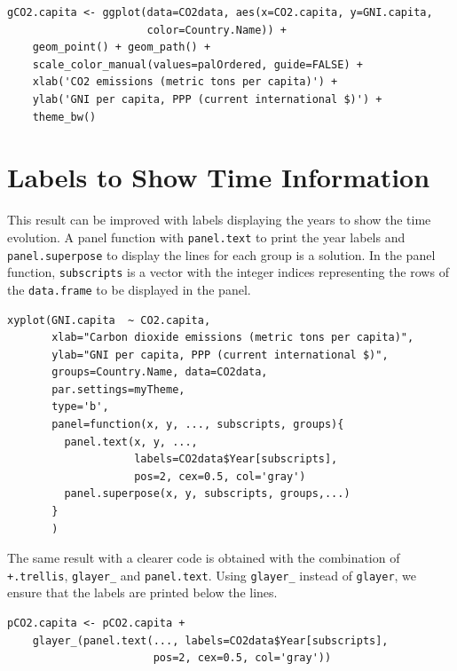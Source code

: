 \documentclass[smallroyalvopaper]{memoir}
\begin{document}
\lstset{language=R,numbers=none}
\begin{lstlisting}
gCO2.capita <- ggplot(data=CO2data, aes(x=CO2.capita, y=GNI.capita,
                      color=Country.Name)) +
    geom_point() + geom_path() +
    scale_color_manual(values=palOrdered, guide=FALSE) +
    xlab('CO2 emissions (metric tons per capita)') +
    ylab('GNI per capita, PPP (current international $)') +
    theme_bw()
\end{lstlisting}
\section{Labels to Show Time Information}
\label{sec-3}
This result can be improved with labels displaying the years to show
the time evolution.  A panel function with \texttt{panel.text} to print the
year labels and \texttt{panel.superpose} to display the lines for each group
is a solution. In the panel function, \texttt{subscripts} is a vector with
the integer indices representing the rows of the \texttt{data.frame} to be
displayed in the panel.

 

\lstset{language=R,numbers=none}
\begin{lstlisting}
xyplot(GNI.capita  ~ CO2.capita,
       xlab="Carbon dioxide emissions (metric tons per capita)",
       ylab="GNI per capita, PPP (current international $)",
       groups=Country.Name, data=CO2data,
       par.settings=myTheme,
       type='b', 
       panel=function(x, y, ..., subscripts, groups){
         panel.text(x, y, ...,
                    labels=CO2data$Year[subscripts],
                    pos=2, cex=0.5, col='gray')
         panel.superpose(x, y, subscripts, groups,...)
       }
       )
\end{lstlisting}

The same result with a clearer code is obtained with the combination
of \texttt{+.trellis}, \texttt{glayer\_} and \texttt{panel.text}. Using \texttt{glayer\_} instead of
\texttt{glayer}, we ensure that the labels are printed below the lines.


\lstset{language=R,numbers=none}
\begin{lstlisting}
pCO2.capita <- pCO2.capita +
    glayer_(panel.text(..., labels=CO2data$Year[subscripts],
                       pos=2, cex=0.5, col='gray'))
\end{lstlisting}
\end{document}

